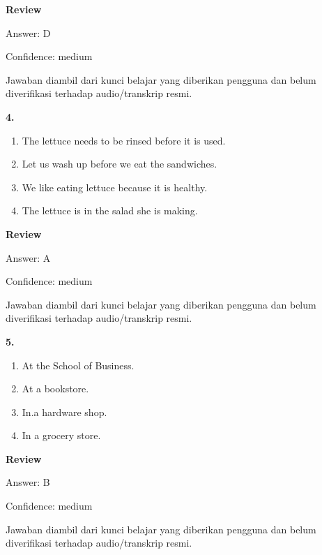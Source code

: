 \documentclass[12pt]{article}
\begin{document}
\par
\begingroup
\setlength{\parskip}{0pt}
\setlength{\parindent}{0pt}
\textbf{Review}\par
Answer: D\par
Confidence: medium\par
Jawaban diambil dari kunci belajar yang diberikan pengguna dan belum diverifikasi terhadap audio/transkrip resmi.\par
\endgroup
\par
\vspace{0.25\baselineskip}
\noindent\textbf{4.}
\begin{enumerate}[label=(\Alph*),leftmargin=*,itemsep=0.2em]
\item The lettuce needs to be rinsed before it is used.
\item Let us wash up before we eat the sandwiches.
\item We like eating lettuce because it is healthy.
\item The lettuce is in the salad she is making.
\end{enumerate}
\par
\begingroup
\setlength{\parskip}{0pt}
\setlength{\parindent}{0pt}
\textbf{Review}\par
Answer: A\par
Confidence: medium\par
Jawaban diambil dari kunci belajar yang diberikan pengguna dan belum diverifikasi terhadap audio/transkrip resmi.\par
\endgroup
\par
\vspace{0.25\baselineskip}
\noindent\textbf{5.}
\begin{enumerate}[label=(\Alph*),leftmargin=*,itemsep=0.2em]
\item At the School of Business.
\item At a bookstore.
\item In.a hardware shop.
\item In a grocery store.
\end{enumerate}
\par
\begingroup
\setlength{\parskip}{0pt}
\setlength{\parindent}{0pt}
\textbf{Review}\par
Answer: B\par
Confidence: medium\par
Jawaban diambil dari kunci belajar yang diberikan pengguna dan belum diverifikasi terhadap audio/transkrip resmi.\par
\endgroup
\par
\end{document}
